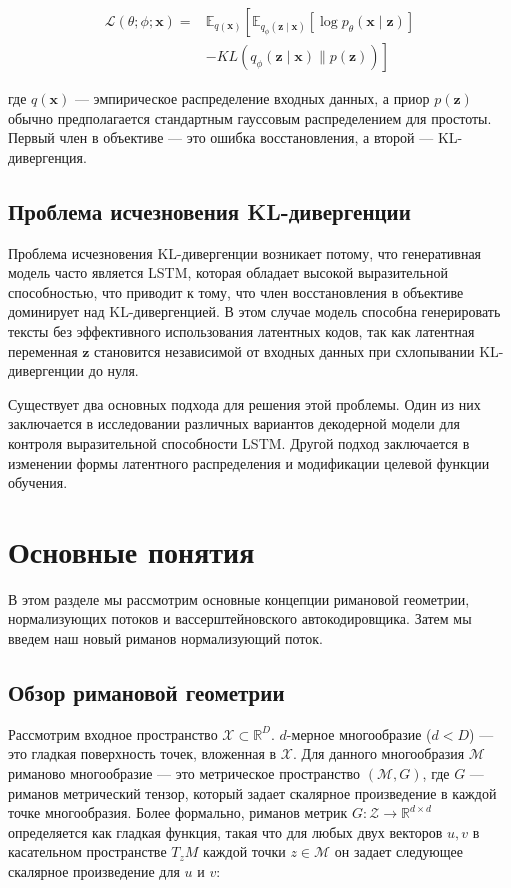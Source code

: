 \documentclass{article}
\begin{document}
\[
\begin{aligned}
\mathcal{L}(\theta ; \phi ; \mathbf{x}) = & \mathbb{E}_{q(\mathbf{x})}\left[\mathbb{E}_{q_{\phi}(\mathbf{z} \mid \mathbf{x})}[\log p_{\theta}(\mathbf{x} \mid \mathbf{z})]\right. \\
& \left.-KL(q_{\phi}(\mathbf{z} \mid \mathbf{x}) \| p(\mathbf{z}))\right]
\end{aligned}
\]

где \(q(\mathbf{x})\) — эмпирическое распределение входных данных, а приор \(p(\mathbf{z})\) обычно предполагается стандартным гауссовым распределением для простоты. Первый член в объективе — это ошибка восстановления, а второй — KL-дивергенция.

\subsection{Проблема исчезновения KL-дивергенции}
Проблема исчезновения KL-дивергенции возникает потому, что генеративная модель часто является LSTM, которая обладает высокой выразительной способностью, что приводит к тому, что член восстановления в объективе доминирует над KL-дивергенцией. В этом случае модель способна генерировать тексты без эффективного использования латентных кодов, так как латентная переменная \(\mathbf{z}\) становится независимой от входных данных при схлопывании KL-дивергенции до нуля.

Существует два основных подхода для решения этой проблемы. Один из них заключается в исследовании различных вариантов декодерной модели для контроля выразительной способности LSTM. Другой подход заключается в изменении формы латентного распределения и модификации целевой функции обучения.

\section{Основные понятия}

В этом разделе мы рассмотрим основные концепции римановой геометрии, нормализующих потоков и вассерштейновского автокодировщика. Затем мы введем наш новый риманов нормализующий поток.

\subsection{Обзор римановой геометрии}
Рассмотрим входное пространство \(\mathcal{X} \subset \mathbb{R}^D\). \(d\)-мерное многообразие (\(d < D\)) — это гладкая поверхность точек, вложенная в \(\mathcal{X}\). Для данного многообразия \(\mathcal{M}\) риманово многообразие — это метрическое пространство \((\mathcal{M}, G)\), где \(G\) — риманов метрический тензор, который задает скалярное произведение в каждой точке многообразия. Более формально, риманов метрик \(G: \mathcal{Z} \rightarrow \mathbb{R}^{d \times d}\) определяется как гладкая функция, такая что для любых двух векторов \(u, v\) в касательном пространстве \(T_z M\) каждой точки \(z \in \mathcal{M}\) он задает следующее скалярное произведение для \(u\) и \(v\):
\end{document}
